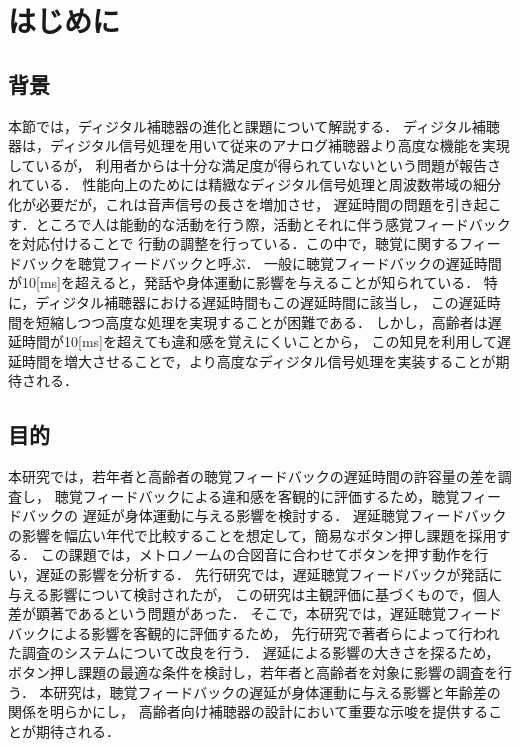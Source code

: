 \section{はじめに}
\subsection{背景}
本節では，ディジタル補聴器の進化と課題について解説する．
ディジタル補聴器は，ディジタル信号処理を用いて従来のアナログ補聴器より高度な機能を実現しているが，
利用者からは十分な満足度が得られていないという問題が報告されている\cite{cf:Manzokudo}．
性能向上のためには精緻なディジタル信号処理と周波数帯域の細分化が必要だが，これは音声信号の長さを増加させ，
遅延時間の問題を引き起こす．ところで人は能動的な活動を行う際，活動とそれに伴う感覚フィードバックを対応付けることで
行動の調整を行っている．この中で，聴覚に関するフィードバックを聴覚フィードバックと呼ぶ\cite{cf:DAF}．
一般に聴覚フィードバックの遅延時間が10[ms]を超えると，発話や身体運動に影響を与えることが知られている\cite{cf:DelayTime-ninnchi}．
特に，ディジタル補聴器における遅延時間もこの遅延時間に該当し，
この遅延時間を短縮しつつ高度な処理を実現することが困難である．
しかし，高齢者は遅延時間が10[ms]を超えても違和感を覚えにくいことから，
この知見を利用して遅延時間を増大させることで，より高度なディジタル信号処理を実装することが期待される．
\subsection{目的}
本研究では，若年者と高齢者の聴覚フィードバックの遅延時間の許容量の差を調査し，
聴覚フィードバックによる違和感を客観的に評価するため，聴覚フィードバックの
遅延が身体運動に与える影響を検討する．
遅延聴覚フィードバックの影響を幅広い年代で比較することを想定して，簡易なボタン押し課題を採用する．
この課題では，メトロノームの合図音に合わせてボタンを押す動作を行い，遅延の影響を分析する．
先行研究\cite{cf:kayama}では，遅延聴覚フィードバックが発話に与える影響について検討されたが，
この研究は主観評価に基づくもので，個人差が顕著であるという問題があった．
そこで，本研究では，遅延聴覚フィードバックによる影響を客観的に評価するため，
先行研究\cite{cf:shigematu}で著者らによって行われた調査のシステムについて改良を行う．
遅延による影響の大きさを探るため，ボタン押し課題の最適な条件を検討し，若年者と高齢者を対象に影響の調査を行う．
本研究は，聴覚フィードバックの遅延が身体運動に与える影響と年齢差の関係を明らかにし，
高齢者向け補聴器の設計において重要な示唆を提供することが期待される．